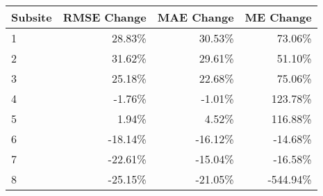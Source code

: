 \begin{tabular}{lrrr}
\toprule
Subsite &  RMSE Change & MAE Change & ME Change \\
\midrule
1 & 28.83\% & 30.53\% & 73.06\% \\
2 & 31.62\% & 29.61\% & 51.10\% \\
3 & 25.18\% & 22.68\% & 75.06\% \\
4 & -1.76\% & -1.01\% & 123.78\% \\
5 & 1.94\% & 4.52\% & 116.88\% \\
6 & -18.14\% & -16.12\% & -14.68\% \\
7 & -22.61\% & -15.04\% & -16.58\% \\
8 & -25.15\% & -21.05\% & -544.94\% \\
\bottomrule
\end{tabular}
